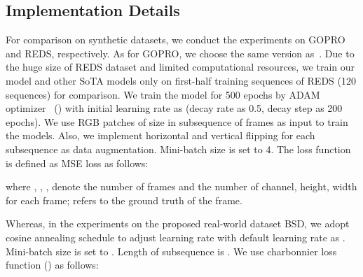 \documentclass[twocolumn]{svjour3}          \smartqed  \usepackage{graphicx}
\begin{document}
\subsection{Implementation Details}

For comparison on synthetic datasets, we conduct the experiments on GOPRO and REDS, respectively. As for GOPRO, we choose the same version as~\cite{nah2019recurrent}. Due to the huge size of REDS dataset and limited computational resources, we train our model and other SoTA models only on first-half training sequences of REDS (120 sequences) for comparison. We train the model for 500 epochs by ADAM optimizer~\cite{kingma2014adam} () with initial learning rate as  (decay rate as 0.5, decay step as 200 epochs). We use RGB patches of  size in subsequence of  frames as input to train the models. Also, we implement horizontal and vertical flipping for each subsequence as data augmentation. Mini-batch size is set to 4. The loss function is defined as MSE loss  as follows:

where , , ,  denote the number of frames and the number of channel, height, width for each frame;  refers to the ground truth of the  frame.

Whereas, in the experiments on the proposed real-world dataset BSD, we adopt cosine annealing schedule to adjust learning rate with default learning rate as . Mini-batch size is set to . Length of subsequence is . We use charbonnier loss function  () as follows:
\end{document}
